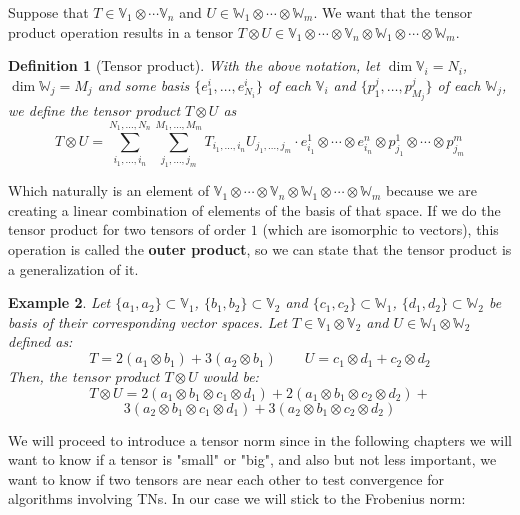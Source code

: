 \documentclass[11pt,a4paper,openright,oneside]{book}
\numberwithin{equation}{section}
\newtheorem{defn0}{Definition}[chapter]
\newtheorem{example0}[defn0]{Example}
\newenvironment{definition}{ \begin{defn0}}{\end{defn0}}
\newenvironment{example}{ \begin{example0}\rm}{\end{example0}}
\begin{document}
Suppose that
$T \in \mathbb{V}_1 \otimes \cdots \mathbb{V}_n$ and $U \in \mathbb{W}_1 \otimes \cdots \otimes \mathbb{W}_m$. We want 
that the tensor product
operation results in a tensor $T \otimes U \in \mathbb{V}_1 \otimes \cdots \otimes \mathbb{V}_n \otimes \mathbb{W}_1 \otimes \cdots \otimes \mathbb{W}_m$.

\begin{definition}[Tensor product] With the above notation, let $\dim \mathbb{V}_i = N_i$, $\dim \mathbb{W}_j = M_j$
    and some basis $\{e_1^i, \dots, e_{N_i}^i\}$ of each $\mathbb{V}_i$ and $\{p_1^j, \dots, p_{M_j}^j\}$ of each $\mathbb{W}_j$,
    we define the tensor product
    $T \otimes U$ as
    \begin{equation}
        T \otimes U = \sum_{i_1, \dots, i_n}^{N_1, \dots, N_n} \sum_{j_1, \dots, j_m}^{M_1, \dots, M_m} T_{i_1, \dots, i_n} U_{j_1, \dots, j_m} \cdot
    e_{i_1}^1 \otimes \cdots \otimes e_{i_n}^n \otimes p_{j_1}^1 \otimes \cdots \otimes p_{j_m}^m
    \label{eq:tensor_product}
\end{equation}
\end{definition}

Which naturally is an element of $\mathbb{V}_1 \otimes \cdots \otimes \mathbb{V}_n \otimes \mathbb{W}_1 \otimes \cdots \otimes \mathbb{W}_m$
because we are creating a linear combination of elements of the basis of that space.
If we do the tensor product for two tensors of order $1$ (which are isomorphic to vectors), this operation is called the \textbf{outer product},
so we can state that the tensor product is a generalization of it.

\begin{example}
    Let $\{a_1, a_2\} \subset \mathbb{V}_1$, $\{b_1, b_2\} \subset \mathbb{V}_2$ and $\{c_1, c_2\} \subset \mathbb{W}_1$, $\{d_1, d_2\} \subset \mathbb{W}_2$ be basis
    of their corresponding vector spaces. Let $T \in \mathbb{V}_1 \otimes \mathbb{V}_2$ and $U \in \mathbb{W}_1 \otimes \mathbb{W}_2$ defined as:
    $$T = 2 (a_1 \otimes b_1) + 3 (a_2 \otimes b_1) \qquad U = c_1 \otimes d_1 + c_2 \otimes d_2$$
    Then, the tensor product $T \otimes U$ would be:
    $$T \otimes U = 2 (a_1 \otimes b_1 \otimes c_1 \otimes d_1) + 2 (a_1 \otimes b_1 \otimes c_2 \otimes d_2) + $$$$
    3 (a_2 \otimes b_1 \otimes c_1 \otimes d_1) + 3 (a_2 \otimes b_1 \otimes c_2 \otimes d_2)$$
\end{example}

We will proceed to introduce a tensor norm since in the following chapters we will want to know if
a tensor is "small" or "big", and also but not less important, we want to know if two tensors are near each other
to test convergence for algorithms involving \gls{TN}s. In our case we will stick to the Frobenius norm:
\end{document}
